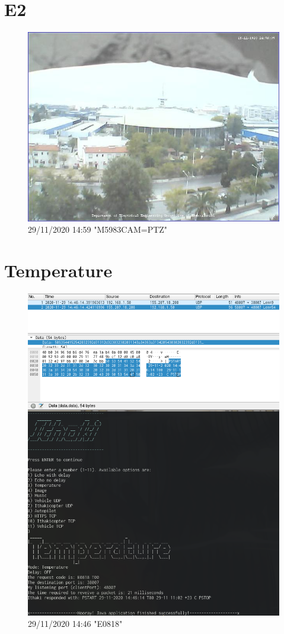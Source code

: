 \documentclass[hidelinks, 12pt, a4paper]{article}
\begin{document}
\section{E2}

\begin{figure}[h!]
\centering
	\includegraphics[height=.35\textheight, width=\textwidth]{assets/session2/image_ptz.jpg}
	\caption{29/11/2020 14:59 "M5983CAM=PTZ"} 
\end{figure}


\section{Temperature}

\begin{figure}[h!]
\centering
	\includegraphics[height=.38\textheight, width=.8\textwidth]{assets/session2/temp.png}
	\caption{29/11/2020 14:46 "E0818"} 
\end{figure}
\end{document}
